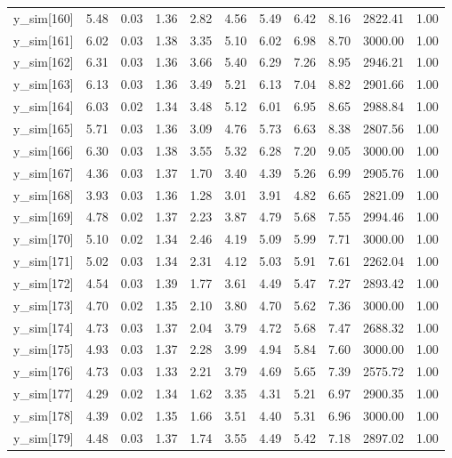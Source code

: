 \begin{table}[ht]
\begin{tabular}{rrrrrrrrrrr}
  y\_sim[160] & 5.48 & 0.03 & 1.36 & 2.82 & 4.56 & 5.49 & 6.42 & 8.16 & 2822.41 & 1.00 \\ 
  y\_sim[161] & 6.02 & 0.03 & 1.38 & 3.35 & 5.10 & 6.02 & 6.98 & 8.70 & 3000.00 & 1.00 \\ 
  y\_sim[162] & 6.31 & 0.03 & 1.36 & 3.66 & 5.40 & 6.29 & 7.26 & 8.95 & 2946.21 & 1.00 \\ 
  y\_sim[163] & 6.13 & 0.03 & 1.36 & 3.49 & 5.21 & 6.13 & 7.04 & 8.82 & 2901.66 & 1.00 \\ 
  y\_sim[164] & 6.03 & 0.02 & 1.34 & 3.48 & 5.12 & 6.01 & 6.95 & 8.65 & 2988.84 & 1.00 \\ 
  y\_sim[165] & 5.71 & 0.03 & 1.36 & 3.09 & 4.76 & 5.73 & 6.63 & 8.38 & 2807.56 & 1.00 \\ 
  y\_sim[166] & 6.30 & 0.03 & 1.38 & 3.55 & 5.32 & 6.28 & 7.20 & 9.05 & 3000.00 & 1.00 \\ 
  y\_sim[167] & 4.36 & 0.03 & 1.37 & 1.70 & 3.40 & 4.39 & 5.26 & 6.99 & 2905.76 & 1.00 \\ 
  y\_sim[168] & 3.93 & 0.03 & 1.36 & 1.28 & 3.01 & 3.91 & 4.82 & 6.65 & 2821.09 & 1.00 \\ 
  y\_sim[169] & 4.78 & 0.02 & 1.37 & 2.23 & 3.87 & 4.79 & 5.68 & 7.55 & 2994.46 & 1.00 \\ 
  y\_sim[170] & 5.10 & 0.02 & 1.34 & 2.46 & 4.19 & 5.09 & 5.99 & 7.71 & 3000.00 & 1.00 \\ 
  y\_sim[171] & 5.02 & 0.03 & 1.34 & 2.31 & 4.12 & 5.03 & 5.91 & 7.61 & 2262.04 & 1.00 \\ 
  y\_sim[172] & 4.54 & 0.03 & 1.39 & 1.77 & 3.61 & 4.49 & 5.47 & 7.27 & 2893.42 & 1.00 \\ 
  y\_sim[173] & 4.70 & 0.02 & 1.35 & 2.10 & 3.80 & 4.70 & 5.62 & 7.36 & 3000.00 & 1.00 \\ 
  y\_sim[174] & 4.73 & 0.03 & 1.37 & 2.04 & 3.79 & 4.72 & 5.68 & 7.47 & 2688.32 & 1.00 \\ 
  y\_sim[175] & 4.93 & 0.03 & 1.37 & 2.28 & 3.99 & 4.94 & 5.84 & 7.60 & 3000.00 & 1.00 \\ 
  y\_sim[176] & 4.73 & 0.03 & 1.33 & 2.21 & 3.79 & 4.69 & 5.65 & 7.39 & 2575.72 & 1.00 \\ 
  y\_sim[177] & 4.29 & 0.02 & 1.34 & 1.62 & 3.35 & 4.31 & 5.21 & 6.97 & 2900.35 & 1.00 \\ 
  y\_sim[178] & 4.39 & 0.02 & 1.35 & 1.66 & 3.51 & 4.40 & 5.31 & 6.96 & 3000.00 & 1.00 \\ 
  y\_sim[179] & 4.48 & 0.03 & 1.37 & 1.74 & 3.55 & 4.49 & 5.42 & 7.18 & 2897.02 & 1.00 \\ 

\end{tabular}
\end{table}
